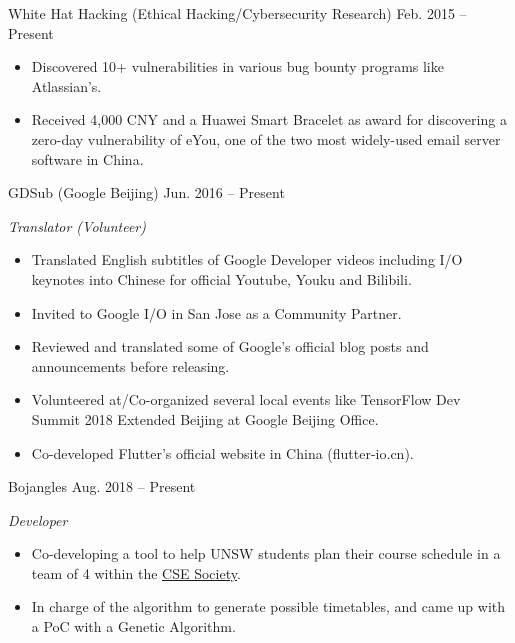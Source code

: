 \documentclass[hidelinks__VERSION__]{adamyi-cv}
\begin{document}
\begin{entrylist}


\entry
{White Hat Hacking (Ethical Hacking/Cybersecurity Research)}
{Feb. 2015 -- Present}
{\begin{itemize}
\item Discovered 10+ vulnerabilities in various bug bounty programs like Atlassian's.
\item Received 4,000 CNY and a Huawei Smart Bracelet as award for discovering a zero-day vulnerability of eYou, one of the two most widely-used email server software in China.
\end{itemize}}


\entry
{GDSub (Google Beijing)}
{Jun. 2016 -- Present}
{\emph{Translator (Volunteer)}
\begin{itemize}
\item Translated English subtitles of Google Developer videos including I/O keynotes into Chinese for official Youtube, Youku and Bilibili.
\item Invited to Google I/O in San Jose as a Community Partner.
\item Reviewed and translated some of Google's official blog posts and announcements before releasing.
\item Volunteered at/Co-organized several local events like TensorFlow Dev Summit 2018 Extended Beijing at Google Beijing Office.
\item Co-developed Flutter's official website in China (flutter-io.cn).
\end{itemize}}


\entry
{Bojangles}
{Aug. 2018 -- Present}
{\emph{Developer}
\begin{itemize}
\item Co-developing a tool to help UNSW students plan their course schedule in a team of 4 within the \href{https://www.csesoc.unsw.edu.au/}{CSE Society}.
\item In charge of the algorithm to generate possible timetables, and came up with a PoC with a Genetic Algorithm.
\end{itemize}}




\end{entrylist}
\end{document}
